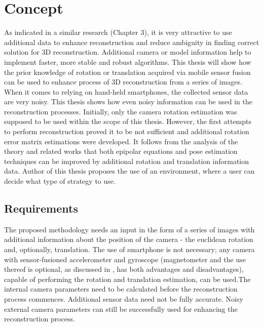 
\chapter{Concept} %
As indicated in a similar research (Chapter 3), it is very attractive to use additional data to enhance reconstruction and reduce ambiguity in finding correct solution for 3D reconstruction. Additional camera or model information help to implement faster, more stable and robust algorithms. This thesis will show how the prior knowledge of rotation or translation acquired via mobile sensor fusion can be used to enhance process of 3D reconstruction from a series of images. When it comes to relying on hand-held smartphones, the collected sensor data are very noisy. This thesis shows how even noisy information can be used in the reconstruction processes. Initially, only the camera rotation estimation was supposed to be used within the scope of this thesis. However, the first attempts to perform reconstruction proved it to be not sufficient and additional rotation error matrix estimations were developed.
It follows from the analysis of the theory and related works that both epipolar equations and pose estimation techniques can be improved by additional rotation and translation information data.  Author of this thesis proposes the use of an environment, where a user can decide what type of strategy to use.
\section{Requirements}
The proposed methodology needs an input in the form of a series of images with additional information about the position of the camera - the euclidean rotation and, optionally, translation. The use of smartphone is not necessary; any camera with sensor-fusioned accelerometer and gyroscope (magnetometer and the use thereof is optional, as discussed in \cite{website:androidSensorOverview}, has both advantages and disadvantages), capable of performing the rotation and translation estimation, can be used.The internal camera parameters need to be calculated before the reconstruction process commences. Additional sensor data need not be fully accurate. Noisy external camera parameters can still be successfully used for enhancing the reconstruction process.
